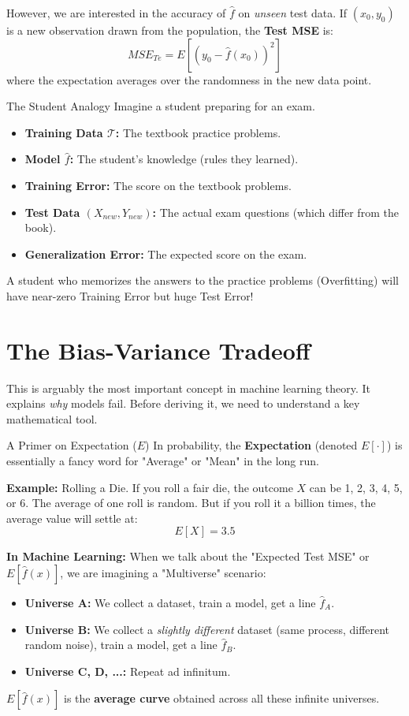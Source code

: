 \documentclass[11pt, a4paper]{article}
\begin{document}
However, we are interested in the accuracy of $\hat{f}$ on \textit{unseen} test data. If $(x_0, y_0)$ is a new observation drawn from the population, the \textbf{Test MSE} is:
\[ MSE_{Te} = E[(y_0 - \hat{f}(x_0))^2] \]
where the expectation averages over the randomness in the new data point.

\begin{intuitionbox}{The Student Analogy}
Imagine a student preparing for an exam.
\begin{itemize}
    \item \textbf{Training Data $\mathcal{T}$:} The textbook practice problems.
    \item \textbf{Model $\hat{f}$:} The student's knowledge (rules they learned).
    \item \textbf{Training Error:} The score on the textbook problems.
    \item \textbf{Test Data $(X_{new}, Y_{new})$:} The actual exam questions (which differ from the book).
    \item \textbf{Generalization Error:} The expected score on the exam.
\end{itemize}
A student who memorizes the answers to the practice problems (Overfitting) will have near-zero Training Error but huge Test Error!
\end{intuitionbox}

\section{The Bias-Variance Tradeoff}

This is arguably the most important concept in machine learning theory. It explains \textit{why} models fail. Before deriving it, we need to understand a key mathematical tool.

\begin{mathbox}{A Primer on Expectation ($E$)}
In probability, the \textbf{Expectation} (denoted $E[\cdot]$) is essentially a fancy word for "Average" or "Mean" in the long run.

\textbf{Example:} Rolling a Die.
If you roll a fair die, the outcome $X$ can be 1, 2, 3, 4, 5, or 6. The average of one roll is random. But if you roll it a billion times, the average value will settle at:
\[ E[X] = 3.5 \]

\textbf{In Machine Learning:}
When we talk about the "Expected Test MSE" or $E[\hat{f}(x)]$, we are imagining a "Multiverse" scenario:
\begin{itemize}
    \item \textbf{Universe A:} We collect a dataset, train a model, get a line $\hat{f}_A$.
    \item \textbf{Universe B:} We collect a \textit{slightly different} dataset (same process, different random noise), train a model, get a line $\hat{f}_B$.
    \item \textbf{Universe C, D, ...:} Repeat ad infinitum.
\end{itemize}
$E[\hat{f}(x)]$ is the \textbf{average curve} obtained across all these infinite universes.
\end{mathbox}
\end{document}
